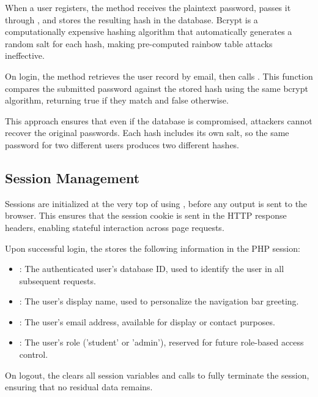 \documentclass[12pt,a4paper]{report}
\begin{document}
When a user registers, the  method receives the plaintext password, passes it through , and stores the resulting hash in the database. Bcrypt is a computationally expensive hashing algorithm that automatically generates a random salt for each hash, making pre-computed rainbow table attacks ineffective.

On login, the  method retrieves the user record by email, then calls . This function compares the submitted password against the stored hash using the same bcrypt algorithm, returning true if they match and false otherwise.

This approach ensures that even if the database is compromised, attackers cannot recover the original passwords. Each hash includes its own salt, so the same password for two different users produces two different hashes.

\subsection{Session Management}

Sessions are initialized at the very top of  using , before any output is sent to the browser. This ensures that the session cookie is sent in the HTTP response headers, enabling stateful interaction across page requests.

Upon successful login, the  stores the following information in the PHP session:

\begin{itemize}
    \item {}: The authenticated user's database ID, used to identify the user in all subsequent requests.
    \item {}: The user's display name, used to personalize the navigation bar greeting.
    \item {}: The user's email address, available for display or contact purposes.
    \item {}: The user's role ('student' or 'admin'), reserved for future role-based access control.
\end{itemize}

On logout, the  clears all session variables and calls  to fully terminate the session, ensuring that no residual data remains.
\end{document}
